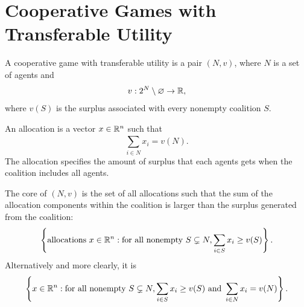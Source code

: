 \section{Cooperative Games with Transferable Utility}

\begin{definition}
	A cooperative game with transferable utility is a pair $(N,v)$, where $N$ is a set of agents and
	\[
		v: 2^N \setminus \varnothing \to \mathbb{R}
	,\] where $v(S)$ is the surplus associated with every nonempty coalition $S$.
\end{definition}

\begin{definition}[Allocation]
	An allocation is a vector $x \in \mathbb{R}^n$ such that \[
		\sum\limits_{i \in N}^{} x_i = v(N)
	.\] 
	The allocation specifies the amount of surplus that each agents gets when the coalition includes all agents.
\end{definition}
\begin{definition}[Core]
	The core of $(N,v)$ is the set of all allocations such that the sum of the allocation components within the coalition is larger than the surplus generated from the coalition: \[
		\left\{\text{allocations } x \in \mathbb{R}^n : \text{for all nonempty } S \subsetneq N, \sum\limits_{i \in S}^{} x_i \ge v(S)\right\}
	.\] 
	Alternatively and more clearly, it is \[
		\left\{x \in \mathbb{R}^n: \text{for all nonempty } S \subsetneq N, \sum\limits_{i \in S}^{} x_i \ge v(S) \text{ and } \sum\limits_{i \in N}^{} x_i = v(N)\right\}
	.\] 
\end{definition}

